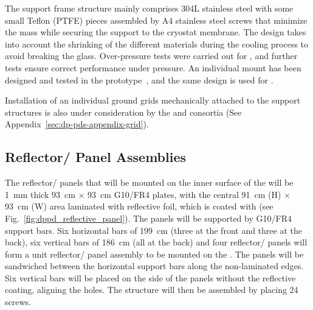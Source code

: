 

The support frame structure mainly comprises \num{304}L stainless steel with some small Teflon (PTFE) pieces assembled by A4 stainless steel screws that minimize the mass while securing the  support to the cryostat membrane. The design %
takes into account the shrinking of the different materials during the cooling process to avoid breaking the  glass.
Over-pressure tests were carried out for , and further tests ensure correct performance under pressure. An individual  mount has been designed and tested in the   prototype~\cite{Zambelli:2017dkg}, and the same design is used for .

Installation of an individual ground grids mechanically attached to the  support structures is also under consideration by the  and \dual {} consortia (See Appendix~\ref{sec:dp-pds-appendix-grid}).


\subsection{Reflector/ Panel Assemblies}
\label{subsec:dp-pds-mechanics-reflectors}

The reflector/ panels that will be mounted on the inner surface of the  will be \SI{1}{\mm} thick \SI{93}{\cm} $\times$ \SI{93}{\cm} G10/FR4 plates, with the central \SI{91}{\cm} (H) $\times$ \SI{93}{\cm} (W) area laminated with reflective foil, which is coated with  (see Fig.~\ref{fig:dppd_reflective_panel}). The panels will be supported by G10/FR4 support bars. Six horizontal bars of \SI{199}{\cm} (three at the front and three at the back), six vertical bars of \SI{186}{\cm} (all at the back) and four reflector/ panels will form a unit reflector/ panel assembly to be mounted on the . The panels will be sandwiched between the horizontal support bars along the non-laminated edges. Six vertical bars will be placed on the side of the panels without the reflective coating, aligning the holes. The structure will then be assembled by placing \num{24} screws.


